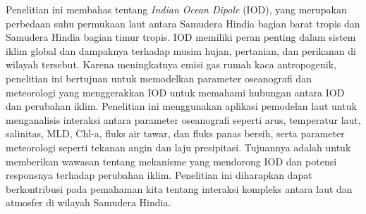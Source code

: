 \begin{spacing}{1.5}
	\pagestyle{empty}
	\begin{center}
		\vskip 1cm
		\justifying
		Penelitian ini membahas tentang \textit{Indian Ocean Dipole} (IOD), yang merupakan perbedaan suhu permukaan laut antara Samudera Hindia bagian barat tropis dan Samudera Hindia bagian timur tropis. IOD memiliki peran penting dalam sistem iklim global dan dampaknya terhadap musim hujan, pertanian, dan perikanan di wilayah tersebut. Karena meningkatnya emisi gas rumah kaca antropogenik, penelitian ini bertujuan untuk memodelkan parameter oseanografi dan meteorologi yang menggerakkan IOD untuk memahami hubungan antara IOD dan perubahan iklim. Penelitian ini menggunakan aplikasi pemodelan laut untuk menganalisis interaksi antara parameter oseanografi seperti arus, temperatur laut, salinitas, MLD, Chl-a, fluks air tawar, dan fluks panas bersih, serta parameter meteorologi seperti tekanan angin dan laju presipitasi. Tujuannya adalah untuk memberikan wawasan tentang mekanisme yang mendorong IOD dan potensi responsnya terhadap perubahan iklim. Penelitian ini diharapkan dapat berkontribusi pada pemahaman kita tentang interaksi kompleks antara laut dan atmosfer di wilayah Samudera Hindia.
	\end{center}
\end{spacing}
\pagestyle{empty}